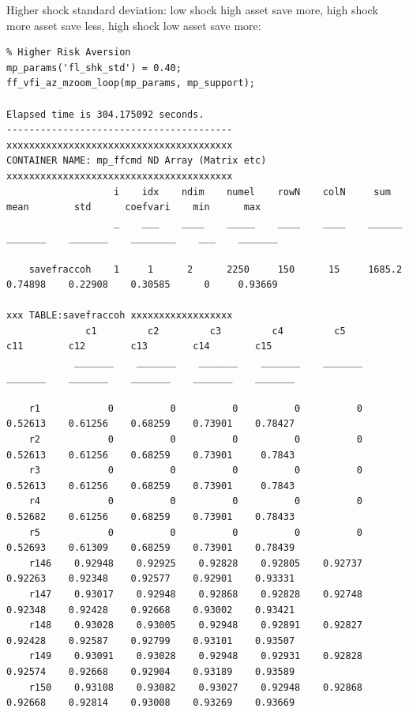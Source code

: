 \documentclass[
]{book}
\begin{document}
Higher shock standard deviation: low shock high asset save more, high
shock more asset save less, high shock low asset save more:

\begin{verbatim}
% Higher Risk Aversion
mp_params('fl_shk_std') = 0.40;
ff_vfi_az_mzoom_loop(mp_params, mp_support);

Elapsed time is 304.175092 seconds.
----------------------------------------
xxxxxxxxxxxxxxxxxxxxxxxxxxxxxxxxxxxxxxxx
CONTAINER NAME: mp_ffcmd ND Array (Matrix etc)
xxxxxxxxxxxxxxxxxxxxxxxxxxxxxxxxxxxxxxxx
                   i    idx    ndim    numel    rowN    colN     sum       mean        std      coefvari    min      max  
                   _    ___    ____    _____    ____    ____    ______    _______    _______    ________    ___    _______

    savefraccoh    1     1      2      2250     150      15     1685.2    0.74898    0.22908    0.30585      0     0.93669

xxx TABLE:savefraccoh xxxxxxxxxxxxxxxxxx
              c1         c2         c3         c4         c5         c11        c12        c13        c14        c15  
            _______    _______    _______    _______    _______    _______    _______    _______    _______    _______

    r1            0          0          0          0          0    0.52613    0.61256    0.68259    0.73901    0.78427
    r2            0          0          0          0          0    0.52613    0.61256    0.68259    0.73901     0.7843
    r3            0          0          0          0          0    0.52613    0.61256    0.68259    0.73901     0.7843
    r4            0          0          0          0          0    0.52682    0.61256    0.68259    0.73901    0.78433
    r5            0          0          0          0          0    0.52693    0.61309    0.68259    0.73901    0.78439
    r146    0.92948    0.92925    0.92828    0.92805    0.92737    0.92263    0.92348    0.92577    0.92901    0.93331
    r147    0.93017    0.92948    0.92868    0.92828    0.92748    0.92348    0.92428    0.92668    0.93002    0.93421
    r148    0.93028    0.93005    0.92948    0.92891    0.92827    0.92428    0.92587    0.92799    0.93101    0.93507
    r149    0.93091    0.93028    0.92948    0.92931    0.92828    0.92574    0.92668    0.92904    0.93189    0.93589
    r150    0.93108    0.93082    0.93027    0.92948    0.92868    0.92668    0.92814    0.93008    0.93269    0.93669
\end{verbatim}
\end{document}
